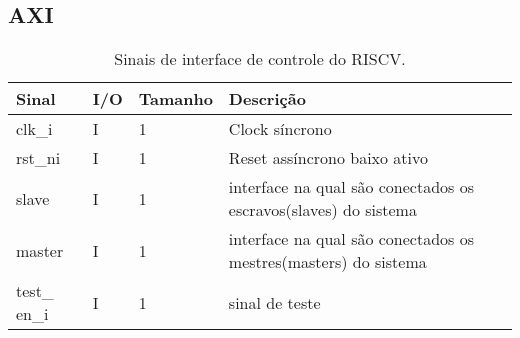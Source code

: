 \subsection{AXI}
\label{sec:axi}
\begin{table}[H]
  \centering
  \renewcommand\arraystretch{1.25}
  \caption{Sinais de interface de controle do RISCV.}
  \vspace{2mm}
  \begin{tabular}{|P{4.0cm}|P{0.7cm}|P{1.5cm}|P{8cm}|}
    \hline
    \textbf{Sinal}        & \textbf{I/O} & \textbf{Tamanho} & \textbf{Descrição}                                    \\ \hline
    clk\_i                 & I            & 1                & Clock síncrono                                       \\ \hline
    rst\_ni                & I            & 1                & Reset assíncrono baixo ativo                          \\ \hline
    slave               & I            & 1    & interface na qual são conectados os escravos(slaves) do sistema \\ \hline
     master              & I            & 1                & interface na qual são conectados os mestres(masters) do sistema \\ \hline
       test\_ en\_i                & I            & 1                & sinal de teste \\ \hline
\end{tabular} 
\end{table}

